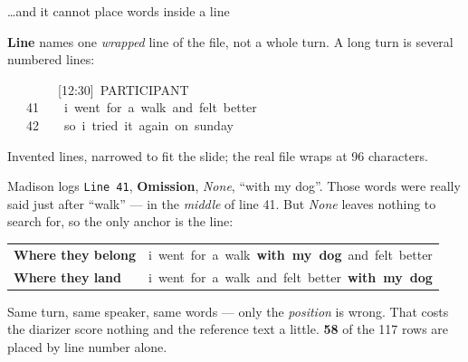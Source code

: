 \documentclass[aspectratio=169]{beamer}
\newcommand{\keybox}[1]{%
  \par\vspace{4pt}\begingroup\centering
  \colorbox{warmbg}{\parbox{0.93\textwidth}{\centering #1}}%
  \par\endgroup\vspace{2pt}}
\newenvironment{nicetable}[1]
  {\par\vspace{2pt}\begingroup\centering\small
   \renewcommand{\arraystretch}{1.18}%
   \setlength{\tabcolsep}{6pt}\rowcolors{2}{band}{white}%
   \begin{tabular}{#1}\arrayrulecolor{hdr}\toprule}
  {\bottomrule\end{tabular}\par\endgroup\vspace{2pt}}
\newcommand{\num}[1]{\textcolor{warm}{\textbf{#1}}}
\begin{document}
\begin{frame}{\ldots and it cannot place words inside a line}

\textbf{Line} names one \emph{wrapped} line of the file, not a whole turn. A long turn is
several numbered lines:

\begin{center}
\colorbox{band}{\parbox{0.86\textwidth}{\ttfamily\footnotesize
~~~~~~~~[12:30]~PARTICIPANT\\
~~~41~~~~i~went~for~a~walk~and~felt~better\\
~~~42~~~~so~i~tried~it~again~on~sunday}}
\end{center}
{\footnotesize\textcolor{soft}{Invented lines, narrowed to fit the slide; the real file
wraps at 96 characters.}}

\vspace{0.3em}
Madison logs \texttt{Line 41}, \textbf{Omission}, \textit{None}, ``with my dog''. Those
words were really said just after ``walk'' --- in the \emph{middle} of line 41. But
\textit{None} leaves nothing to search for, so the only anchor is the line:

\begin{nicetable}{p{3.2cm}p{8.3cm}}
\textcolor{good}{\textbf{Where they belong}}
  & \ttfamily i~went~for~a~walk~\textcolor{good}{\textbf{with~my~dog}}~and~felt~better \\
\textcolor{warm}{\textbf{Where they land}}
  & \ttfamily i~went~for~a~walk~and~felt~better~\textcolor{warm}{\textbf{with~my~dog}} \\
\end{nicetable}

\keybox{Same turn, same speaker, same words --- only the \emph{position} is wrong. That
costs the diarizer score nothing and the reference text a little. \num{58} of the 117 rows
are placed by line number alone.}

\end{frame}

\end{document}
